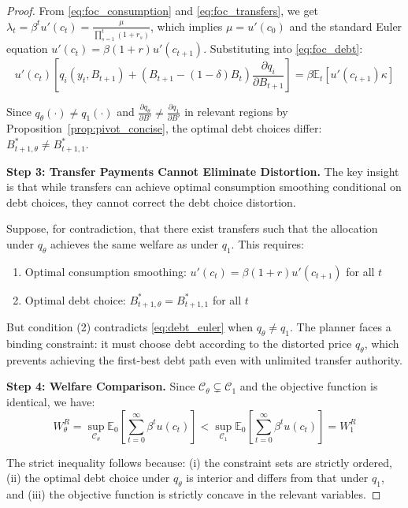 \documentclass[12pt]{article}
\theoremstyle{plain}
\begin{document}
\begin{proof}
	From \eqref{eq:foc_consumption} and \eqref{eq:foc_transfers}, we get $\lambda_t
		= \beta^t u'(c_t) = \frac{\mu}{\prod_{s=1}^t (1+r_s)}$, which implies $\mu =
		u'(c_0)$ and the standard Euler equation $u'(c_t) = \beta(1+r) u'(c_{t+1})$.
	Substituting into \eqref{eq:foc_debt}:
	\begin{equation}
		u'(c_t) \left[ q_i(y_t, B_{t+1}) + (B_{t+1} - (1-\delta)B_t) \frac{\partial q_i}{\partial B_{t+1}} \right] = \beta \mathbb{E}_t[u'(c_{t+1}) \kappa] \label{eq:debt_euler}
	\end{equation}

	Since $q_\theta(\cdot) \neq q_1(\cdot)$ and $\frac{\partial q_\theta}{\partial
			B'} \neq \frac{\partial q_1}{\partial B'}$ in relevant regions by
	Proposition~\ref{prop:pivot_concise}, the optimal debt choices differ:
	$B^*_{t+1,\theta} \neq B^*_{t+1,1}$.

	\textbf{Step 3: Transfer Payments Cannot Eliminate Distortion.} The key insight is that while transfers can achieve optimal consumption smoothing conditional on debt choices, they cannot correct the debt choice distortion.

	Suppose, for contradiction, that there exist transfers such that the allocation
	under $q_\theta$ achieves the same welfare as under $q_1$. This requires:
	\begin{enumerate}
		\item Optimal consumption smoothing: $u'(c_t) = \beta(1+r) u'(c_{t+1})$ for all $t$
		\item Optimal debt choice: $B^*_{t+1,\theta} = B^*_{t+1,1}$ for all $t$
	\end{enumerate}

	But condition (2) contradicts \eqref{eq:debt_euler} when $q_\theta \neq q_1$.
	The planner faces a binding constraint: it must choose debt according to the
	distorted price $q_\theta$, which prevents achieving the first-best debt path
	even with unlimited transfer authority.

	\textbf{Step 4: Welfare Comparison.} Since $\mathcal{C}_\theta \subsetneq \mathcal{C}_1$ and the objective function is identical, we have:
	\begin{equation}
		W^R_\theta = \sup_{\mathcal{C}_\theta} \mathbb{E}_0 \left[ \sum_{t=0}^\infty \beta^t u(c_t) \right] < \sup_{\mathcal{C}_1} \mathbb{E}_0 \left[ \sum_{t=0}^\infty \beta^t u(c_t) \right] = W^R_1
	\end{equation}

	The strict inequality follows because: (i) the constraint sets are strictly
	ordered, (ii) the optimal debt choice under $q_\theta$ is interior and differs
	from that under $q_1$, and (iii) the objective function is strictly concave in
	the relevant variables.
\end{proof}
\end{document}
